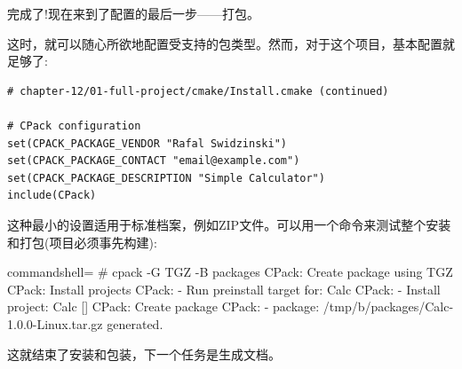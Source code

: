 完成了!现在来到了配置的最后一步——打包。


这时，就可以随心所欲地配置受支持的包类型。然而，对于这个项目，基本配置就足够了:

\begin{lstlisting}[style=styleCMake]
# chapter-12/01-full-project/cmake/Install.cmake (continued)

# CPack configuration
set(CPACK_PACKAGE_VENDOR "Rafal Swidzinski")
set(CPACK_PACKAGE_CONTACT "email@example.com")
set(CPACK_PACKAGE_DESCRIPTION "Simple Calculator")
include(CPack)
\end{lstlisting}

这种最小的设置适用于标准档案，例如ZIP文件。可以用一个命令来测试整个安装和打包(项目必须事先构建):

\begin{tcblisting}{commandshell={}}
# cpack -G TGZ -B packages
CPack: Create package using TGZ
CPack: Install projects
CPack: - Run preinstall target for: Calc
CPack: - Install project: Calc []
CPack: Create package
CPack: - package: /tmp/b/packages/Calc-1.0.0-Linux.tar.gz
generated.
\end{tcblisting}

这就结束了安装和包装，下一个任务是生成文档。










